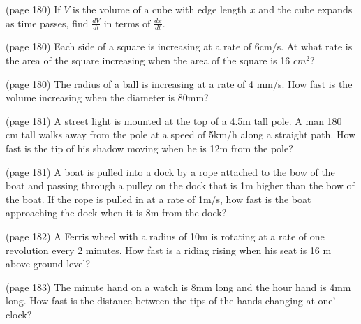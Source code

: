\begin{problem} (page 180)
If $V$ is the volume of a cube with edge length $x$ and the cube expands as time passes, find $\frac{dV}{dt}$ in terms of $\frac{dx}{dt}$.
\end{problem}
\begin{problem} (page 180)
Each side of a square is increasing at a rate of 6cm/s. At what rate is the area of the square increasing when the area of the square is 16 $cm^2$?
\end{problem}
\begin{problem}(page 180)
The radius of a ball is increasing at a rate of 4 mm/s. How fast is the volume increasing when the diameter is 80mm?
\end{problem}
\begin{problem}(page 181)
A street light is mounted at the top of a 4.5m tall pole. A man 180 cm tall walks away from the pole at a speed of 5km/h along a straight path. How fast is the tip of his shadow moving when he is 12m from the pole?
\end{problem}
\begin{problem}(page 181)
A boat is pulled into a dock by a rope attached to the bow of the boat and passing through a pulley on the dock that is 1m higher than the bow of the boat. If the rope is pulled in at a rate of 1m/s, how fast is the boat approaching the dock when it is 8m from the dock?
\end{problem}
\begin{problem}(page 182)
A Ferris wheel with a radius of 10m is rotating at a rate of one revolution every 2 minutes. How fast is a riding rising when his seat is 16 m above ground level?
\end{problem}
\begin{problem}(page 183)
The minute hand on a watch is 8mm long and the hour hand is 4mm long. How fast is the distance between the tips of the hands changing at one' clock?
\end{problem}